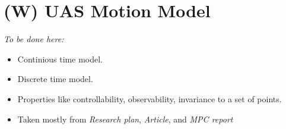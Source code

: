 \section{(W) UAS Motion Model}\label{s:uavMotionModel}
    \emph{To be done here:}
    \begin{itemize}
        \item Continious time model.
        \item Discrete time model.
        \item Properties like controllability, observability, invariance to a set of points.
        \item Taken mostly from \emph{Research plan}, \emph{Article}, and \emph{MPC report}
    \end{itemize}